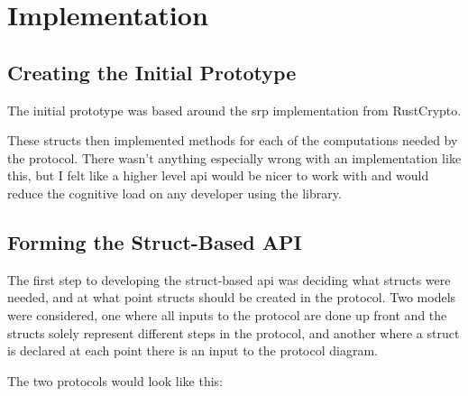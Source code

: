 \chapter{Implementation}
\label{chap:impl}

\section{Creating the Initial Prototype}
The initial prototype was based around the \gls{srp} implementation from RustCrypto.


These structs then implemented methods for each of the computations needed by the protocol.
There wasn't anything especially wrong with an implementation like this, but I felt like a higher level \gls{api} would be nicer to work with and would reduce the cognitive load on any developer using the library.

\section{Forming the Struct-Based API}
The first step to developing the struct-based \gls{api} was deciding what structs were needed, and at what point structs should be created in the protocol.
Two models were considered, one where all inputs to the protocol are done up front and the structs solely represent different steps in the protocol, and another where a struct is declared at each point there is an input to the protocol diagram.

The two protocols would look like this:

